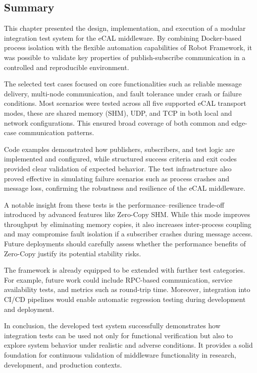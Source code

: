\newpage
\subsection{Summary}

This chapter presented the design, implementation, and execution of a modular integration test system for the eCAL middleware. By combining Docker-based process isolation with the flexible automation capabilities of Robot Framework, it was possible to validate key properties of publish-subscribe communication in a controlled and reproducible environment.

\vspace{1em}
The selected test cases focused on core functionalities such as reliable message delivery, multi-node communication, and fault tolerance under crash or failure conditions. Most scenarios were tested across all five supported eCAL transport modes, these are shared memory (SHM), UDP, and TCP in both local and network configurations. This ensured broad coverage of both common and edge-case communication patterns.

\vspace{1em}
Code examples demonstrated how publishers, subscribers, and test logic are implemented and configured, while structured success criteria and exit codes provided clear validation of expected behavior. The test infrastructure also proved effective in simulating failure scenarios such as process crashes and message loss, confirming the robustness and resilience of the eCAL middleware.

\vspace{1em}
A notable insight from these tests is the performance–resilience trade-off introduced by advanced features like Zero-Copy SHM. While this mode improves throughput by eliminating memory copies, it also increases inter-process coupling and may compromise fault isolation if a subscriber crashes during message access. Future deployments should carefully assess whether the performance benefits of Zero-Copy justify its potential stability risks.

\vspace{1em}
The framework is already equipped to be extended with further test categories. For example, future work could include RPC-based communication, service availability tests, and metrics such as round-trip time. Moreover, integration into CI/CD pipelines would enable automatic regression testing during development and deployment.

\vspace{1em}
In conclusion, the developed test system successfully demonstrates how integration tests can be used not only for functional verification but also to explore system behavior under realistic and adverse conditions. It provides a solid foundation for continuous validation of middleware functionality in research, development, and production contexts.


